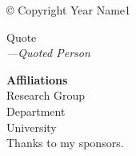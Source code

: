 \clearpage \pagestyle{empty}


\copyright{} Copyright Year Name1





\cleardoublepage\pagestyle{empty}

\begin{quotepage}
Quote\\
\vspace{0.5cm}
\textit{---Quoted Person}\\
\end{quotepage}



\clearpage


\noindent \textbf{Affiliations}\\

\noindent Research Group\\
\noindent Department\\
\noindent University\\

\noindent Thanks to my sponsors.






